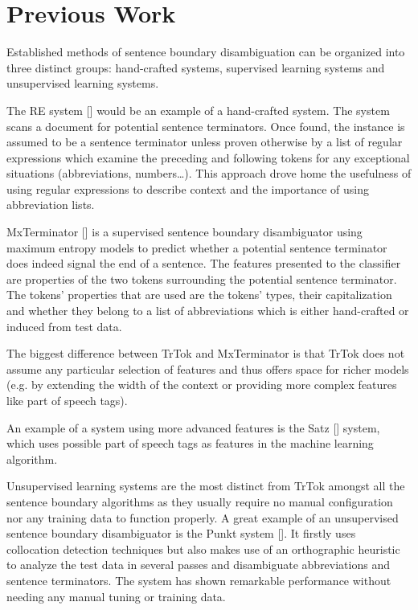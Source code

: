 \section{Previous Work}
\label{sec:previous-work}

Established methods of sentence boundary disambiguation can be
organized into three distinct groups: hand-crafted systems, supervised
learning systems and unsupervised learning systems.

The RE system [] would be an example of a hand-crafted system. The
system scans a document for potential sentence terminators. Once
found, the instance is assumed to be a sentence terminator unless
proven otherwise by a list of regular expressions which examine the
preceding and following tokens for any exceptional situations
(abbreviations, numbers\ldots). This approach drove home the
usefulness of using regular expressions to describe context and the
importance of using abbreviation lists.

MxTerminator [] is a supervised sentence boundary disambiguator using
maximum entropy models to predict whether a potential sentence
terminator does indeed signal the end of a sentence. The features
presented to the classifier are properties of the two tokens
surrounding the potential sentence terminator. The tokens' properties
that are used are the tokens' types, their capitalization and whether
they belong to a list of abbreviations which is either hand-crafted or
induced from test data.

The biggest difference between TrTok and MxTerminator is that TrTok
does not assume any particular selection of features and thus offers
space for richer models (e.g. by extending the width of the context or
providing more complex features like part of speech tags).

An example of a system using more advanced features is the Satz []
system, which uses possible part of speech tags as features in the
machine learning algorithm.

Unsupervised learning systems are the most distinct from TrTok amongst
all the sentence boundary algorithms as they usually require no manual
configuration nor any training data to function properly. A great
example of an unsupervised sentence boundary disambiguator is the
Punkt system []. It firstly uses collocation detection techniques but
also makes use of an orthographic heuristic to analyze the test data
in several passes and disambiguate abbreviations and sentence
terminators. The system has shown remarkable performance without
needing any manual tuning or training data.
